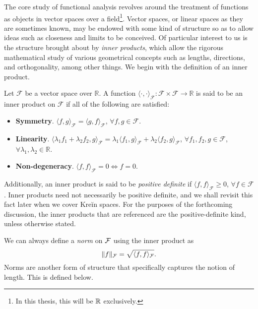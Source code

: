 The core study of functional analysis revolves around the treatment of functions as objects in vector spaces over a field\footnote{In this thesis, this will be $\mathbb{R}$ exclusively.}.
Vector spaces, or linear spaces as they are sometimes known, may be endowed with some kind of structure so as to allow ideas such as closeness and limits to be conceived.
Of particular interest to us is the structure brought about by \emph{inner products}, which allow the rigorous mathematical study of various geometrical concepts such as lengths, directions, and orthogonality, among other things.
We begin with the definition of an inner product. 

\begin{definition}\label{def:innerprod}
	Let $\mathcal F$ be a vector space over $\mathbb R$. A function $\langle\cdot,\cdot\rangle_{\mathcal F}:\mathcal F \times \mathcal F \rightarrow \mathbb R$ is said to be an inner product on $\mathcal F$ if all of the following are satisfied:
	\begin{itemize}
	\item \textbf{Symmetry}. $\langle f, g\rangle_{\mathcal F} = \langle g, f \rangle_{\mathcal F}$, $\forall f,g \in \mathcal F$.
	\item \textbf{Linearity}. $\langle \lambda_1 f_1 + \lambda_2 f_2, g\rangle_{\mathcal F} = \lambda_1\langle f_1,g \rangle_{\mathcal F} + \lambda_2\langle f_2,g \rangle_{\mathcal F}$, $\forall f_1, f_2, g \in \mathcal F$, $\forall \lambda_1,\lambda_2 \in \mathbb R$.
	\item \textbf{Non-degeneracy}. $\langle f, f\rangle_{\mathcal F} = 0 \Leftrightarrow f=0$.
	\end{itemize}
\end{definition}

Additionally, an inner product is said to be \emph{positive definite} if $\langle f, f\rangle_{\mathcal F} \geq 0$, $\forall f \in \mathcal F$.
Inner products need not necessarily be positive definite, and we shall revisit this fact later when we cover Kreĭn spaces.
For the purposes of the forthcoming discussion, the inner products that are referenced are the positive-definite kind, unless otherwise stated.

We can always define a \emph{norm} on ${\mathcal F}$ using the inner product as 
\begin{equation}\label{eq:normip}
  \lVert f\rVert_{\mathcal F} = \sqrt{\langle f,f\rangle_{\mathcal F}}.
\end{equation}
Norms are another form of structure that specifically captures the notion of length. 
This is defined below.

